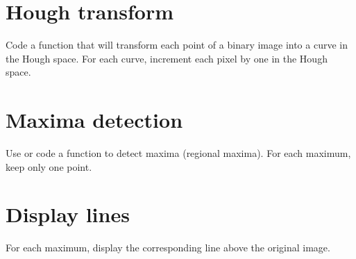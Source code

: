\section{Hough transform}
\begin{qbox}
Code a function that will transform each point of a binary image into a curve in the Hough space. For each curve, increment each pixel by one in the Hough space.
\end{qbox}

\section{Maxima detection}
\begin{qbox}
Use or code a function to detect maxima (regional maxima). For each maximum, keep only one point.
\end{qbox}

\section{Display lines}
\begin{qbox}
For each maximum, display the corresponding line above the original image.
\end{qbox}
